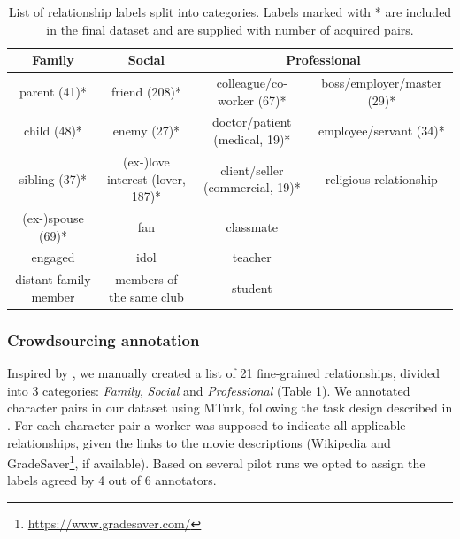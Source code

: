 \begin{table}[h!]\sffamily
\centering
\begin{adjustbox}{width=0.95\textwidth}
\begin{tabular}{cccc}
\textbf{Family}       & \textbf{Social}          & \multicolumn{2}{c}{\textbf{Professional}}  \\ \toprule
parent (41)*                & friend (208)*                   & colleague/co-worker (67)*  &  boss/employer/master (29)* \\
child (48)*                 & enemy (27)*                    & doctor/patient (medical, 19)*       &  employee/servant (34)* \\
sibling (37)*               & (ex-)love interest (lover, 187)*       & client/seller (commercial, 19)*        &  religious relationship \\
(ex-)spouse (69)*           & fan                      & classmate       \\
engaged               & idol                     & teacher                \\
distant family member & members of the same club & student                \\
\end{tabular}
\end{adjustbox}
\caption{List of relationship labels split into categories. Labels marked with * are included in the final dataset and are supplied with number of acquired pairs.}
\label{relation-list}
\end{table}

\subsubsection{Crowdsourcing annotation}

Inspired by \citet{massey2015annotating}, we manually created a list of 21 fine-grained relationships, divided into 3 categories: \emph{Family}, \emph{Social} and \emph{Professional} (Table \ref{relation-list}). %
We annotated character pairs in our dataset using MTurk, following the task design described in \citet{massey2015annotating}. For each character pair a worker was supposed to indicate all applicable relationships, given the links to the movie descriptions (Wikipedia and GradeSaver\footnote{\url{https://www.gradesaver.com/}}, if available). Based on several pilot runs we opted to assign the labels agreed by 4 out of 6 annotators.

